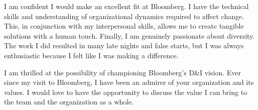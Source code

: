 \documentclass[11pt,a4paper,sans]{moderncv}        %
\begin{document}
I am confident I would make an excellent fit at Bloomberg. I have the technical
skills and understanding of organizational dynamics required to affect change.
This, in conjunction with my interpersonal skills, allows me to create tangible
solutions with a human touch. Finally, I am genuinely passionate about
diversity. The work I did resulted in many late nights and false starts, but I
was always enthusiastic because I felt like I was making a difference. 

I am thrilled at the possibility of championing Bloomberg’s D\&I vision. Ever
since my visit to Bloomberg, I have been an admirer of your organization and
its values. I would love to have the opportunity to discuss the value I can
bring to the team and the organization as a whole.

\makeletterclosing

\end{document}
